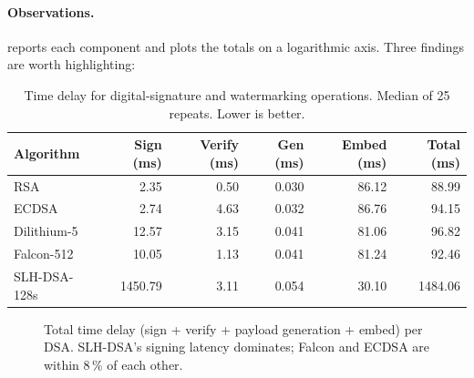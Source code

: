 \documentclass[11pt,a4paper]{article}
\theoremstyle{definition}
\theoremstyle{plain}
\theoremstyle{remark}
\begin{document}
\paragraph{Observations.}
 reports each component and  plots the
totals on a logarithmic axis. Three findings are worth highlighting:

\begin{table}[!ht]\centering
\caption{Time delay for digital-signature and watermarking operations.
Median of 25 repeats. Lower is better.}\label{tab:exp1}
\small
\begin{tabular}{l r r r r r}
\toprule
Algorithm & Sign (ms) & Verify (ms) & Gen (ms) & Embed (ms) & Total (ms)\\
\midrule
RSA          &    2.35 & 0.50 & 0.030 & 86.12 &   88.99 \\
ECDSA        &    2.74 & 4.63 & 0.032 & 86.76 &   94.15 \\
Dilithium-5  &   12.57 & 3.15 & 0.041 & 81.06 &   96.82 \\
Falcon-512   &   10.05 & 1.13 & 0.041 & 81.24 &   92.46 \\
SLH-DSA-128s & 1450.79 & 3.11 & 0.054 & 30.10 & 1484.06 \\
\bottomrule
\end{tabular}
\end{table}

\begin{figure}[!ht]
\centering
{}
\caption{Total time delay (sign + verify + payload generation + embed)
per DSA. SLH-DSA's signing latency dominates; Falcon and ECDSA are
within 8\,\% of each other.}\label{fig:exp1}
\end{figure}
\end{document}

